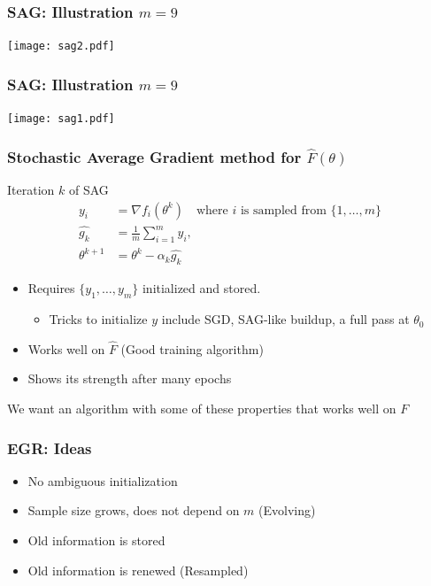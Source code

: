 \documentclass{beamer}
\begin{document}
		\begin{frame}
			\frametitle{SAG: Illustration $m=9$}
			\begin{center}
					\texttt{[image: sag2.pdf]}
			\end{center}
	    \end{frame}

		\begin{frame}
			\frametitle{SAG: Illustration $m=9$}
			\begin{center}
					\texttt{[image: sag1.pdf]}
			\end{center}
	    \end{frame}
		
		\begin{frame}
			\frametitle{Stochastic Average Gradient method for $\hat{F}(\theta) $}
				\begin{block}{Iteration $k$ of SAG}
 \begin{align*}
   y_i &= \nabla f_i(\theta^k) \quad \mbox{where } i \mbox{ is sampled from } \{1,\ldots,m\} \\
   \hat{g_k} &= \frac{1}{m} \sum_{i=1}^m y_i , \\
   \theta^{k+1} &= \theta^k - \alpha_k \hat{g_k}
 \end{align*}
\end{block}
	
			\begin{itemize}
	\pause
				\item Requires $\{y_1,\ldots,y_m\}$ initialized and stored. 
				
				\begin{itemize}
	\pause
					\item Tricks to initialize $y$ include SGD, SAG-like buildup, a full pass at $\theta_0$
				\end{itemize}
	
	\pause
				\item Works well on $\hat{F}$ (Good training algorithm)
	
	\pause
				\item Shows its strength after many epochs
			\end{itemize}
	\pause
			We want an algorithm with some of these properties that works well on $F$
		\end{frame}
		
		
		
		\begin{frame}
			\frametitle{EGR: Ideas}
			\begin{itemize}
				\item No ambiguous initialization
				
				\item Sample size grows, does not depend on $m$ (Evolving)
	
				\item Old information is stored
	
				\item Old information is renewed (Resampled)
			\end{itemize}
		\end{frame}	 
		
\end{document}
